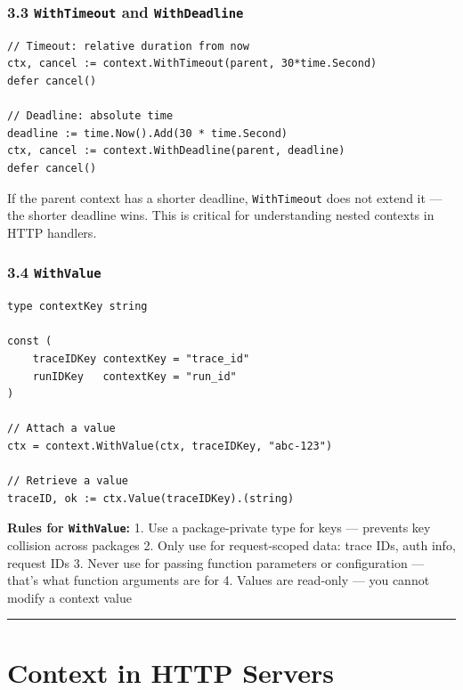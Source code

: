 \documentclass[11pt,a4paper,oneside]{book}
\begin{document}
\subsubsection{\texorpdfstring{3.3 \texttt{WithTimeout} and
\texttt{WithDeadline}}{3.3 WithTimeout and WithDeadline}}

\begin{verbatim}
// Timeout: relative duration from now
ctx, cancel := context.WithTimeout(parent, 30*time.Second)
defer cancel()

// Deadline: absolute time
deadline := time.Now().Add(30 * time.Second)
ctx, cancel := context.WithDeadline(parent, deadline)
defer cancel()
\end{verbatim}

If the parent context has a shorter deadline, \texttt{WithTimeout} does
not extend it --- the shorter deadline wins. This is critical for
understanding nested contexts in HTTP handlers.

\subsubsection{\texorpdfstring{3.4
\texttt{WithValue}}{3.4 WithValue}}

\begin{verbatim}
type contextKey string

const (
    traceIDKey contextKey = "trace_id"
    runIDKey   contextKey = "run_id"
)

// Attach a value
ctx = context.WithValue(ctx, traceIDKey, "abc-123")

// Retrieve a value
traceID, ok := ctx.Value(traceIDKey).(string)
\end{verbatim}

\textbf{Rules for \texttt{WithValue}:} 1. Use a package-private type for
keys --- prevents key collision across packages 2. Only use for
request-scoped data: trace IDs, auth info, request IDs 3. Never use for
passing function parameters or configuration --- that's what function
arguments are for 4. Values are read-only --- you cannot modify a
context value

\begin{center}\rule{0.5\linewidth}{0.5pt}\end{center}

\section{Context in HTTP Servers}
\end{document}
